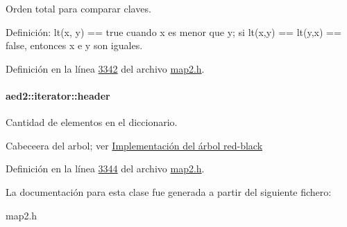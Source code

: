 \-Orden total para comparar claves. 

\-Definición\-: lt(x, y) == true cuando x es menor que y; si lt(x,y) == lt(y,x) == false, entonces x e y son iguales. 

\-Definición en la línea \hyperlink{map2_8h_source_l03342}{3342} del archivo \hyperlink{map2_8h_source}{map2.\-h}.

\hypertarget{classaed2_1_1iterator_a19db18e2e77583eb1fa819e854ff9c71_a19db18e2e77583eb1fa819e854ff9c71}{
\paragraph[{header}]{ {\bf aed2\-::iterator\-::header}}}\label{classaed2_1_1iterator_a19db18e2e77583eb1fa819e854ff9c71_a19db18e2e77583eb1fa819e854ff9c71}


\-Cantidad de elementos en el diccionario. 

\-Cabeceera del arbol; ver \hyperlink{Implementacion}{\-Implementación del árbol red-\/black} 

\-Definición en la línea \hyperlink{map2_8h_source_l03344}{3344} del archivo \hyperlink{map2_8h_source}{map2.\-h}.



\-La documentación para esta clase fue generada a partir del siguiente fichero\-:\begin{DoxyCompactItemize}
\item 
map2.\-h\end{DoxyCompactItemize}
